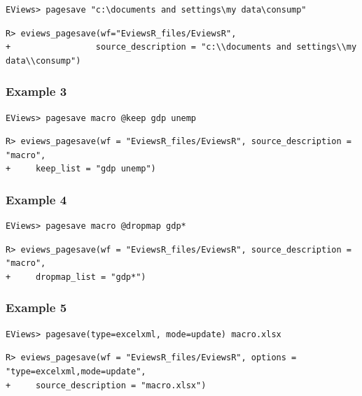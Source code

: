 \begin{verbatim}
EViews> pagesave "c:\documents and settings\my data\consump"
\end{verbatim}

\begin{verbatim}
R> eviews_pagesave(wf="EviewsR_files/EviewsR",
+                 source_description = "c:\\documents and settings\\my data\\consump")
\end{verbatim}

\hypertarget{example-3-3}{%
\subsubsection{Example 3}\label{example-3-3}}

\begin{verbatim}
EViews> pagesave macro @keep gdp unemp
\end{verbatim}

\begin{verbatim}
R> eviews_pagesave(wf = "EviewsR_files/EviewsR", source_description = "macro",
+     keep_list = "gdp unemp")
\end{verbatim}

\hypertarget{example-4-3}{%
\subsubsection{Example 4}\label{example-4-3}}

\begin{verbatim}
EViews> pagesave macro @dropmap gdp*
\end{verbatim}

\begin{verbatim}
R> eviews_pagesave(wf = "EviewsR_files/EviewsR", source_description = "macro",
+     dropmap_list = "gdp*")
\end{verbatim}

\hypertarget{example-5-3}{%
\subsubsection{Example 5}\label{example-5-3}}

\begin{verbatim}
EViews> pagesave(type=excelxml, mode=update) macro.xlsx
\end{verbatim}

\begin{verbatim}
R> eviews_pagesave(wf = "EviewsR_files/EviewsR", options = "type=excelxml,mode=update",
+     source_description = "macro.xlsx")
\end{verbatim}

